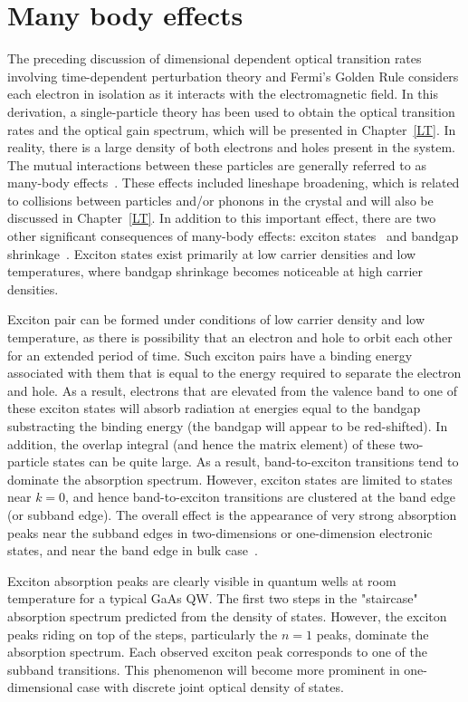 \section{Many body effects}

The preceding discussion of dimensional dependent optical transition rates
involving time-dependent perturbation theory and Fermi's Golden Rule considers
each electron in isolation as it interacts with the electromagnetic field. In
this derivation, a single-particle theory has been used to obtain the optical
transition rates and the optical gain spectrum, which will be presented in
Chapter~\ref{LT}. In reality, there is a large density of both electrons and
holes present in the system. The mutual interactions between these particles
are generally referred to as many-body effects~\cite{coldren2012diode}. These
effects included lineshape broadening, which is related to collisions between
particles and/or phonons in the crystal and will also be discussed in
Chapter~\ref{LT}. In addition to this important effect, there are two other
significant consequences of many-body effects: exciton
states~\cite{Suemune:1988jw} and bandgap shrinkage~\cite{Wang:2001to}. Exciton
states exist primarily at low carrier densities and low temperatures, where
bandgap shrinkage becomes noticeable at high carrier densities.

Exciton pair can be formed under conditions of low carrier density and low
temperature, as there is possibility that an electron and hole to orbit each
other for an extended period of time.  Such exciton pairs have a binding energy
associated with them that is equal to the energy required to separate the
electron and hole. As a result, electrons that are elevated from the valence
band to one of these exciton states will absorb radiation at energies equal to
the bandgap substracting the binding energy (the bandgap will appear to be
red-shifted). In addition, the overlap integral (and hence the matrix element)
of these two-particle states can be quite large. As a result, band-to-exciton
transitions tend to dominate the absorption spectrum.  However, exciton states
are limited to states near $k = 0$, and hence band-to-exciton transitions are
clustered at the band edge (or subband edge). The overall effect is the
appearance of very strong absorption peaks near the subband edges in
two-dimensions or one-dimension electronic states, and near the band edge in
bulk case~\cite{coldren2012diode}.

Exciton absorption peaks are clearly visible in quantum wells at room
temperature for a typical GaAs QW. The first two steps in the "staircase"
absorption spectrum predicted from the density of states. However, the exciton
peaks riding on top of the steps, particularly the $n = 1$ peaks, dominate the
absorption spectrum. Each observed exciton peak corresponds to one of the
subband transitions. This phenomenon will become more prominent in
one-dimensional case with discrete joint optical density of states.

